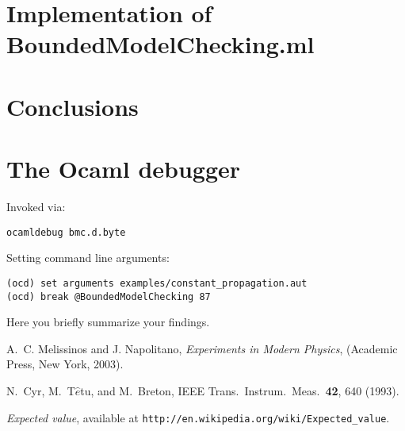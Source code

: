 \documentclass[letterpaper,12pt]{article}
\begin{document}
\section{Implementation of BoundedModelChecking.ml}

\section{Conclusions}
\section{The Ocaml debugger}
Invoked via:
\begin{verbatim}
ocamldebug bmc.d.byte
\end{verbatim}
Setting command line arguments:
\begin{verbatim}
(ocd) set arguments examples/constant_propagation.aut
(ocd) break @BoundedModelChecking 87
\end{verbatim}




Here you briefly summarize your findings.


\begin{thebibliography}{99}

A.~C. Melissinos and J. Napolitano, \textit{Experiments in Modern Physics},
(Academic Press, New York, 2003).

N.\ Cyr, M.\ T$\hat{e}$tu, and M.\ Breton,
IEEE Trans.\ Instrum.\ Meas.\ \textbf{42}, 640 (1993).

 \emph{Expected value},  available at
\texttt{http://en.wikipedia.org/wiki/Expected\_value}.

\end{thebibliography}
\end{document}
